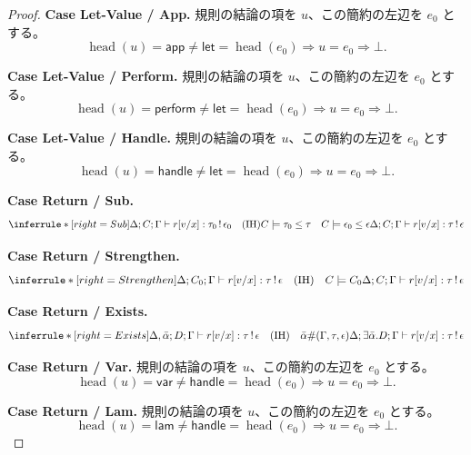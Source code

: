 \documentclass[a4paper,11pt]{article}
\theoremstyle{definition}
\newenvironment{Case}[1]{\par\smallskip\noindent\textbf{Case #1.}\enspace\ignorespaces}{\par}
\newcommand{\jj}[6]{#1;#2;#3\vdash #4:#5\,!\,#6}
\begin{document}
\begin{proof}
\begin{Case}{Let-Value / App}
規則の結論の項を $u$、この簡約の左辺を $e_0$ とする。
\[\operatorname{head}(u)=\mathsf{app}\ne\mathsf{let}
 =\operatorname{head}(e_0)\Longrightarrow u=e_0\Rightarrow\bot.\]
\end{Case}

\begin{Case}{Let-Value / Perform}
規則の結論の項を $u$、この簡約の左辺を $e_0$ とする。
\[\operatorname{head}(u)=\mathsf{perform}\ne\mathsf{let}
 =\operatorname{head}(e_0)\Longrightarrow u=e_0\Rightarrow\bot.\]
\end{Case}

\begin{Case}{Let-Value / Handle}
規則の結論の項を $u$、この簡約の左辺を $e_0$ とする。
\[\operatorname{head}(u)=\mathsf{handle}\ne\mathsf{let}
 =\operatorname{head}(e_0)\Longrightarrow u=e_0\Rightarrow\bot.\]
\end{Case}

\begin{Case}{Return / Sub}
\[
\inferrule*[right=Sub]{\jj{\Delta}{C}{\Gamma}{r[v/x]}{\tau_0}{\epsilon_0}\quad(\mathrm{IH})\\ C\models\tau_0\leq\tau\quad C\models\epsilon_0\leq\epsilon}{\jj{\Delta}{C}{\Gamma}{r[v/x]}{\tau}{\epsilon}}
\]
\end{Case}

\begin{Case}{Return / Strengthen}
\[
\inferrule*[right=Strengthen]{\jj{\Delta}{C_0}{\Gamma}{r[v/x]}{\tau}{\epsilon}\quad(\mathrm{IH})\quad C\models C_0}{\jj{\Delta}{C}{\Gamma}{r[v/x]}{\tau}{\epsilon}}
\]
\end{Case}

\begin{Case}{Return / Exists}
\[
\inferrule*[right=Exists]{\jj{\Delta,\bar\alpha}{D}{\Gamma}{r[v/x]}{\tau}{\epsilon}\quad(\mathrm{IH})\quad\bar\alpha\#(\Gamma,\tau,\epsilon)}{\jj{\Delta}{\exists\bar\alpha.D}{\Gamma}{r[v/x]}{\tau}{\epsilon}}
\]
\end{Case}

\begin{Case}{Return / Var}
規則の結論の項を $u$、この簡約の左辺を $e_0$ とする。
\[\operatorname{head}(u)=\mathsf{var}\ne\mathsf{handle}
 =\operatorname{head}(e_0)\Longrightarrow u=e_0\Rightarrow\bot.\]
\end{Case}

\begin{Case}{Return / Lam}
規則の結論の項を $u$、この簡約の左辺を $e_0$ とする。
\[\operatorname{head}(u)=\mathsf{lam}\ne\mathsf{handle}
 =\operatorname{head}(e_0)\Longrightarrow u=e_0\Rightarrow\bot.\]
\end{Case}


\end{proof}
\end{document}
